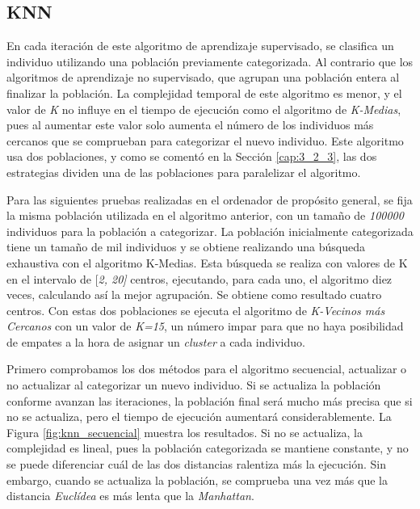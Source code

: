 \subsection{KNN}


En cada iteración de este algoritmo de aprendizaje supervisado, se clasifica un individuo utilizando una población previamente categorizada. Al contrario que los algoritmos de aprendizaje no supervisado, que agrupan una población entera al finalizar la población. La complejidad temporal de este algoritmo es menor, y el valor de \textit{K} no influye en el tiempo de ejecución como el algoritmo de \textit{K-Medias}, pues al aumentar este valor solo aumenta el número de los individuos más cercanos que se comprueban para categorizar el nuevo individuo. Este algoritmo usa dos poblaciones, y como se comentó en la Sección \ref{cap:3_2_3}, las dos estrategias dividen una de las poblaciones para paralelizar el algoritmo. 

Para las siguientes pruebas realizadas en el ordenador de propósito general, se fija la misma población utilizada en el algoritmo anterior, con un tamaño de \textit{100000} individuos para la población a categorizar. La población inicialmente categorizada tiene un tamaño de mil individuos y se obtiene realizando una búsqueda exhaustiva con el algoritmo K-Medias. Esta búsqueda se realiza con valores de K en el intervalo de [\textit{2, 20]} centros, ejecutando, para cada uno, el algoritmo diez veces, calculando así la mejor agrupación. Se obtiene como resultado cuatro centros. Con estas dos poblaciones se ejecuta el algoritmo de \textit{K-Vecinos más Cercanos} con un valor de \textit{K=15}, un número impar para que no haya posibilidad de empates a la hora de asignar un \textit{cluster} a cada individuo.


Primero comprobamos los dos métodos para el algoritmo secuencial, actualizar o no actualizar al categorizar un nuevo individuo. Si se actualiza la población conforme avanzan las iteraciones, la población final será mucho más precisa que si no se actualiza, pero el tiempo de ejecución aumentará considerablemente. La Figura \ref{fig:knn_secuencial} muestra los resultados. Si no se actualiza, la complejidad es lineal, pues la población categorizada se mantiene constante, y no se puede diferenciar cuál de las dos distancias ralentiza más la ejecución. Sin embargo, cuando se actualiza la población, se comprueba una vez más que la distancia \textit{Euclídea} es más lenta que la \textit{Manhattan}.


